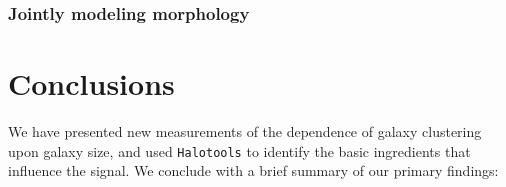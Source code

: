 \documentclass[usenatbib,usegraphicx,letterpaper]{mn2e}
\newcommand{\rhalf}{R_{1/2}}
\newcommand{\mstar}{M_{\ast}}
\begin{document}
\subsubsection{Jointly modeling morphology}




\section{Conclusions}
\label{sec:conclusion}

We have presented new measurements of the dependence of galaxy clustering upon galaxy size, and used {\tt Halotools} to identify the basic ingredients that influence the signal. We conclude with a brief summary of our primary findings:
\end{document}
